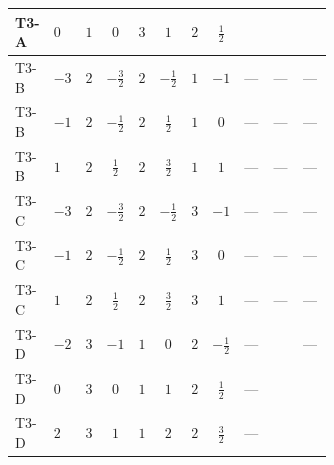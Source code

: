 \documentclass[8pt]{article}
\begin{document}
\begin{landscape}
\begin{longtable}{@{}llcccccc >{\raggedright\arraybackslash}p{0.21\linewidth} >{\raggedright\arraybackslash}p{0.21\linewidth} >{\raggedright\arraybackslash}p{0.21\linewidth}@{}}
\midrule
T3-A & $0$ & $1$ & $0$ & $3$ & $1$ & $2$ & $\frac{1}{2}$ & \scriptsize\adjustbox{max width=\linewidth}{$\begin{gathered} +6 {g_2}^4\end{gathered}$} & \scriptsize\adjustbox{max width=\linewidth}{$\begin{gathered} -\frac{33 {g_2}^2 {\lambda_{HS_2}^{(1)}}}{2}\end{gathered}$} & \scriptsize\adjustbox{max width=\linewidth}{$\begin{gathered} +3 {g_1}^4\end{gathered}$} \\
\midrule
T3-B & $-3$ & $2$ & $-\frac{3}{2}$ & $2$ & $-\frac{1}{2}$ & $1$ & $-1$ & --- & --- & --- \\
\midrule
T3-B & $-1$ & $2$ & $-\frac{1}{2}$ & $2$ & $\frac{1}{2}$ & $1$ & $0$ & --- & --- & --- \\
\midrule
T3-B & $1$ & $2$ & $\frac{1}{2}$ & $2$ & $\frac{3}{2}$ & $1$ & $1$ & --- & --- & --- \\
\midrule
T3-C & $-3$ & $2$ & $-\frac{3}{2}$ & $2$ & $-\frac{1}{2}$ & $3$ & $-1$ & --- & --- & --- \\
\midrule
T3-C & $-1$ & $2$ & $-\frac{1}{2}$ & $2$ & $\frac{1}{2}$ & $3$ & $0$ & --- & --- & --- \\
\midrule
T3-C & $1$ & $2$ & $\frac{1}{2}$ & $2$ & $\frac{3}{2}$ & $3$ & $1$ & --- & --- & --- \\
\midrule
T3-D & $-2$ & $3$ & $-1$ & $1$ & $0$ & $2$ & $-\frac{1}{2}$ & --- & \scriptsize\adjustbox{max width=\linewidth}{$\begin{gathered} -\frac{9 {g_2}^2 {\lambda_{HS_2}^{(1)}}}{2}\end{gathered}$} & --- \\
\midrule
T3-D & $0$ & $3$ & $0$ & $1$ & $1$ & $2$ & $\frac{1}{2}$ & --- & \scriptsize\adjustbox{max width=\linewidth}{$\begin{gathered} -\frac{9 {g_2}^2 {\lambda_{HS_2}^{(1)}}}{2}\end{gathered}$} & \scriptsize\adjustbox{max width=\linewidth}{$\begin{gathered} +3 {g_1}^4\end{gathered}$} \\
\midrule
T3-D & $2$ & $3$ & $1$ & $1$ & $2$ & $2$ & $\frac{3}{2}$ & --- & \scriptsize\adjustbox{max width=\linewidth}{$\begin{gathered} -\frac{9 {g_2}^2 {\lambda_{HS_2}^{(1)}}}{2}\end{gathered}$} & \scriptsize\adjustbox{max width=\linewidth}{$\begin{gathered} +12 {g_1}^4\end{gathered}$} \\

\end{longtable}
\end{landscape}
\end{document}
